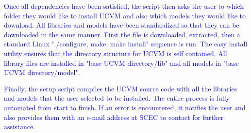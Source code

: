 \textcolor{blue}{Once all dependencies have been satisfied, the script then asks the user to which folder they would like to install UCVM and also which models they would like to download. All libraries and models have been standardized so that they can be downloaded in the same manner. First the file is downloaded, extracted, then a standard Linux "./configure, make, make install" sequence is run. The easy install utility ensures that the directory structure for UCVM is self contained. All library files are installed in "base UCVM directory/lib" and all models in "base UCVM directory/model".}

\textcolor{blue}{Finally, the setup script compiles the UCVM source code with all the libraries and models that the user selected to be installed. The entire process is fully automated from start to finish. If an error is encountered, it notifies the user and also provides them with an e-mail address at SCEC to contact for further assistance.}

